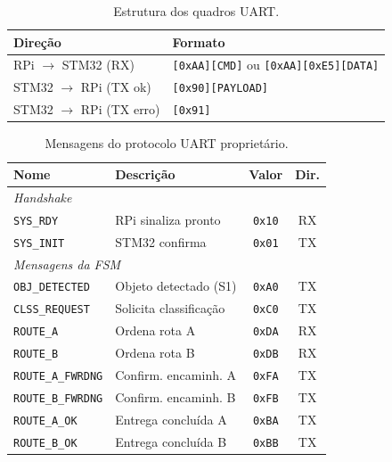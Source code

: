 \begin{table}[!htpb]
\renewcommand{\arraystretch}{0.9}
\caption{Estrutura dos quadros UART.}
\label{tab:uart_protocol}
\centering
\footnotesize
\begin{tabular}{lp{4cm}}
\hline
\textbf{Direção} & \textbf{Formato} \\
\hline
RPi $\to$ STM32 (RX)      & \texttt{[0xAA][CMD]} ou \newline\texttt{[0xAA][0xE5][DATA]} \\
STM32 $\to$ RPi (TX ok)   & \texttt{[0x90][PAYLOAD]} \\
STM32 $\to$ RPi (TX erro) & \texttt{[0x91]} \\
\hline
\end{tabular}
\end{table}

\begin{table}[!htpb]
\renewcommand{\arraystretch}{0.8}
\caption{Mensagens do protocolo UART proprietário.}
\label{tab:uart_messages}
\centering
\footnotesize
\begin{tabular}{p{2.2cm}p{2.9cm}cc}
\hline
\textbf{Nome} & \textbf{Descrição} & \textbf{Valor} & \textbf{Dir.} \\
\hline
\multicolumn{4}{l}{\textit{Handshake}} \\
\texttt{SYS\_RDY}         & RPi sinaliza pronto          & \texttt{0x10} & RX \\
\texttt{SYS\_INIT}        & STM32 confirma               & \texttt{0x01} & TX \\
\hline
\multicolumn{4}{l}{\textit{Mensagens da FSM}} \\
\texttt{OBJ\_DETECTED}    & Objeto detectado (S1)        & \texttt{0xA0} & TX \\
\texttt{CLSS\_REQUEST}    & Solicita classificação       & \texttt{0xC0} & TX \\
\texttt{ROUTE\_A}         & Ordena rota A                & \texttt{0xDA} & RX \\
\texttt{ROUTE\_B}         & Ordena rota B                & \texttt{0xDB} & RX \\
\texttt{ROUTE\_A\_FWRDNG} & Confirm. encaminh. A         & \texttt{0xFA} & TX \\
\texttt{ROUTE\_B\_FWRDNG} & Confirm. encaminh. B         & \texttt{0xFB} & TX \\
\texttt{ROUTE\_A\_OK}     & Entrega concluída A          & \texttt{0xBA} & TX \\
\texttt{ROUTE\_B\_OK}     & Entrega concluída B          & \texttt{0xBB} & TX \\

\end{tabular}
\end{table}
